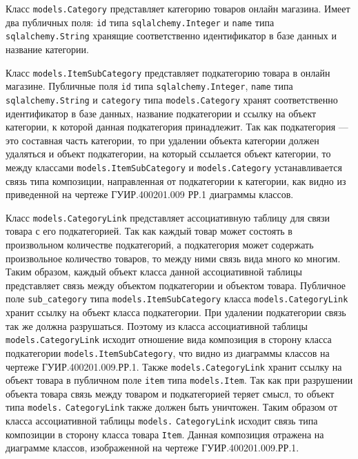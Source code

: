 Класс \texttt{mo\-dels.Category} представляет категорию товаров онлайн магазина. Имеет два публичных поля: \texttt{id} типа \texttt{sqlalchemy.Integer} и \texttt{name} типа \texttt{sqlalchemy.String} хранящие соответственно идентификатор в базе данных и название категории.

Класс \texttt{mo\-dels.ItemSubCategory} представляет подкатегорию товара в онлайн магазине. Публичные поля \texttt{id} типа \texttt{sqlalchemy.Integer}, \texttt{name} типа \texttt{sqlalchemy.String} и \texttt{category} типа \texttt{mo\-dels.Category} хранят соответственно идентификатор в базе данных, название подкатегории и ссылку на объект категории, к которой данная подкатегория принадлежит. Так как подкатегория --- это составная часть категории, то при удалении объекта категории должен удаляться и объект подкатегории, на который ссылается объект категории, то между классами \texttt{mo\-dels.ItemSubCategory} и \texttt{mo\-dels.Category} устанавливается связь типа композиции, направленная от подкатегории к категории, как видно из приведенной на чертеже ГУИР.400201.009 РР.1 диаграммы классов.

Класс \texttt{mo\-dels.CategoryLink} представляет ассоциативную таблицу для связи товара с его подкатегорией. Так как каждый товар может состоять в произвольном количестве подкатегорий, а подкатегория может содержать произвольное количество товаров, то между ними связь вида много ко многим. Таким образом, каждый объект класса данной ассоциативной таблицы представляет связь между объектом подкатегории и объектом товара. Публичное поле \texttt{sub\_category} типа \texttt{mo\-dels.ItemSubCatego\-ry} класса \texttt{mo\-dels.CategoryLink} хранит ссылку на объект класса подкатегории. При удалении подкатегории связь так же должна разрушаться. Поэтому из класса ассоциативной таблицы \texttt{mo\-dels.CategoryLink} исходит отношение вида композиция в сторону класса подкатегории \texttt{mo\-dels.Item\-Sub\-Ca\-te\-go\-ry}, что видно из диаграммы классов на чертеже ГУИР.400201.009.РР.1. Также \texttt{mo\-dels.Cate\-goryLink} хранит ссылку на объект товара в публичном поле \texttt{item} типа \texttt{mo\-dels.Item}. Так как при разрушении объекта товара связь между товаром и подкатегорией теряет смысл, то объект типа \texttt{mo\-dels.} \texttt{Ca\-te\-go\-ry\-Link} также должен быть уничтожен. Таким образом от класса ассоциативной таблицы \texttt{mo\-dels.} \texttt{CategoryLink} исходит связь типа композиции в сторону класса товара \texttt{Item}. Данная композиция отражена на диаграмме классов, изображенной на чертеже ГУИР.400201.009.РР.1.


